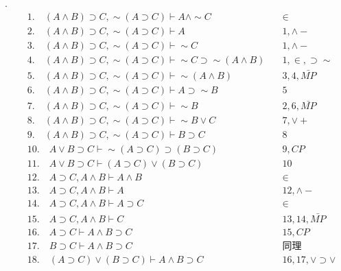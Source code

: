 \documentclass[a4paper]{ctexart}
\begin{document}
.
\begin{align*}
  &1. \quad (A\wedge B)\supset C,\sim(A\supset C) \vdash A\wedge \sim C \quad &\in \\
  &2. \quad (A\wedge B)\supset C,\sim(A\supset C) \vdash A\quad &1,\wedge- \\
  &3. \quad (A\wedge B)\supset C,\sim(A\supset C) \vdash \sim C \quad &1,\wedge- \\
  &4. \quad (A\wedge B)\supset C,\sim(A\supset C) \vdash \sim C\supset \sim(A\wedge B)\quad &1,\in,\supset\sim \\
  &5. \quad (A\wedge B)\supset C,\sim(A\supset C) \vdash \sim(A\wedge B) \quad &3,4,\bar{MP} \\
  &6. \quad (A\wedge B)\supset C,\sim(A\supset C) \vdash A\supset \sim B \quad &5 \\
  &7. \quad (A\wedge B)\supset C,\sim(A\supset C) \vdash \sim B \quad &2,6,\bar{MP} \\
  &8. \quad (A\wedge B)\supset C,\sim(A\supset C) \vdash \sim B\vee C \quad &7,\vee+ \\
  &9. \quad (A\wedge B)\supset C,\sim(A\supset C) \vdash B\supset C \quad &8 \\
  &10. \quad A\vee B\supset C \vdash \sim(A\supset C)\supset(B\supset C) \quad &9,CP \\
  &11. \quad A\vee B\supset C \vdash (A\supset C)\vee (B\supset C) \quad &10 \\
  &12. \quad A\supset C,A\wedge B \vdash A\wedge B \quad &\in \\
  &13. \quad A\supset C,A\wedge B \vdash A \quad &12,\wedge- \\  
  &14. \quad A\supset C,A\wedge B \vdash A\supset C \quad &\in \\
  &15. \quad A\supset C,A\wedge B \vdash C \quad &13,14,\bar{MP} \\
  &16. \quad A\supset C \vdash A\wedge B \supset C\quad &15,CP \\
  &17. \quad B\supset C \vdash A\wedge B \supset C\quad &\text{同理} \\
  &18. \quad (A\supset C)\vee (B\supset C)\vdash  A\wedge B \supset C\quad &16,17,\vee\supset\vee \\
\end{align*}
\end{document}

